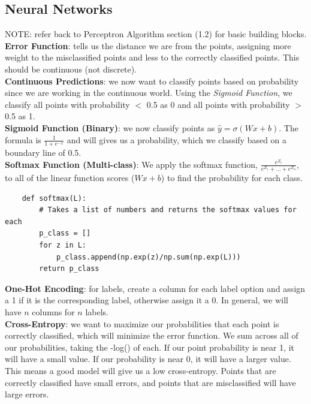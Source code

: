 \documentclass[11pt, a4paper]{article}
\begin{document}
\begin{spacing}{1.1}
	\subsection{Neural Networks}
	NOTE: refer back to Perceptron Algorithm section (1.2) for basic building blocks. \vspace*{2mm}\\
	\textbf{Error Function}: tells us the distance we are from the points, assigning more weight to the misclassified points and less to the correctly classified points. This should be continuous (not discrete). \vspace*{2mm}\\
	\textbf{Continuous Predictions}: we now want to classify points based on probability since we are working in the continuous world. Using the \textit{Sigmoid Function}, we classify all points with probability $<$ 0.5 as 0 and all points with probability $>$ 0.5 as 1. \vspace*{2mm}\\
	\textbf{Sigmoid Function (Binary)}: we now classify points as $\hat{y} = \sigma(Wx+b)$. The formula is $\frac{1}{1+e^{-x}}$ and will gives us a probability, which we classify based on a boundary line of 0.5. \vspace*{2mm}\\
	\textbf{Softmax Function (Multi-class)}: We apply the softmax function, $\frac{e^{Z_i}}{e^{Z_1}+...+e^{Z_n}}$, to all of the linear function scores ($Wx+b$) to find the probability for each class.
	\begin{lstlisting}
	def softmax(L):
		# Takes a list of numbers and returns the softmax values for each
		p_class = []
		for z in L:
			p_class.append(np.exp(z)/np.sum(np.exp(L)))
		return p_class
	\end{lstlisting} \vspace*{2mm}
	\textbf{One-Hot Encoding}: for labels, create a column for each label option and assign a 1 if it is the corresponding label, otherwise assign it a 0. In general, we will have $n$ columns for $n$ labels.\vspace*{2mm}\\
	\textbf{Cross-Entropy}: we want to maximize our probabilities that each point is correctly classified, which will minimize the error function. We sum across all of our probabilities, taking the -log() of each. If our point probability is near 1, it will have a small value. If our probability is near 0, it will have a larger value. This means a good model will give us a low cross-entropy. Points that are correctly classified have small errors, and points that are misclassified will have large errors.	

\end{spacing}
\end{document}
